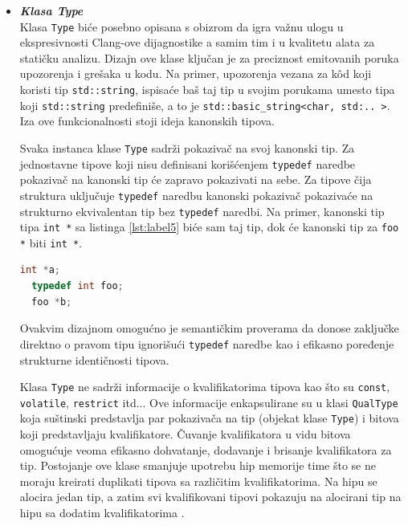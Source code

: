 \documentclass[12pt,oneside]{memoir}
\begin{document}
\begin{itemize}
  \item \textit{\textbf{Klasa Type}} \\ Klasa \lstinline{Type} bi\'{c}e posebno opisana s obizrom da igra va\v{z}nu ulogu u ekspresivnosti Clang-ove dijagnostike a samim tim i u kvalitetu alata za stati\v{c}ku analizu. Dizajn ove klase klju\v{c}an je za preciznost emitovanih poruka upozorenja i gre\v{s}aka u kodu. Na primer, upozorenja vezana za k\^{o}d  koji koristi tip \lstinline{std::string}, ispisa\'{c}e ba\v{s} taj tip u svojim porukama umesto tipa koji \lstinline{std::string} predefini\v{s}e, a to je \lstinline{std::basic_string<char, std:.. >}. Iza ove funkcionalnosti stoji ideja kanonskih tipova.
  
  \par
  Svaka instanca klase \lstinline{Type} sadr\v{z}i pokaziva\v{c} na svoj kanonski tip. Za jednostavne tipove koji nisu definisani kori\v{s}\'{c}enjem \lstinline{typedef} naredbe pokaziva\v{c} na kanonski tip \'{c}e zapravo pokazivati na sebe. Za tipove \v{c}ija struktura uklju\v{c}uje \lstinline{typedef} naredbu kanonski pokaziva\v{c} pokaziva\'{c}e na strukturno ekvivalentan tip bez \lstinline{typedef} naredbi.
  Na primer, kanonski tip tipa \lstinline{int *} sa listinga \ref{lst:label5}  bi\'{c}e sam taj tip, dok \'{c}e kanonski tip za \lstinline{foo *} biti \lstinline{int *}.

\begin{lstlisting}[caption={Demonstracija kanonskih tipova},label=lst:label5,language=C++, captionpos=b]
  int *a;
  typedef int foo;
  foo *b;
\end{lstlisting}
  Ovakvim dizajnom omogu\'{c}no je semanti\v{c}kim proverama da donose zaklju\v{c}ke direktno o pravom tipu ignori\v{s}u\'{c}i \lstinline{typedef} naredbe kao i efikasno poređenje strukturne identi\v{c}nosti tipova.

  \par
  Klasa \lstinline{Type} ne sadr\v{z}i informacije o kvalifikatorima tipova kao \v{s}to su \lstinline{const}, \lstinline{volatile}, \lstinline{restrict} itd... Ove informacije enkapsulirane su u klasi \lstinline{QualType} koja su\v{s}tinski predstavlja par pokaziva\v{c}a na tip (objekat klase \lstinline{Type}) i bitova koji predstavljaju
  kvalifikatore. \v{C}uvanje kvalifikatora u vidu bitova omogu\'{c}uje veoma efikasno dohvatanje, dodavanje i brisanje kvalifikatora za tip. Postojanje ove klase smanjuje upotrebu hip memorije time \v{s}to se ne moraju kreirati duplikati tipova sa razli\v{c}itim kvalifikatorima. Na hipu se alocira jedan tip, a zatim 
  svi kvalifikovani tipovi pokazuju na alocirani tip na hipu sa dodatim kvalifikatorima \cite{CFEWebsite}.
\end{itemize}
\end{document}

